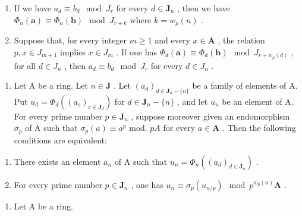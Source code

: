 \begin{enumerate}
\def\labelenumi{\alph{enumi})}
\item
  If we have \(a_d \equiv b_d \mod J_r\) for every \(d \in \mathbf{J}_n\) , then we have \(\Phi_n(\boldsymbol{a}) \equiv \Phi_n(\boldsymbol{b}) \mod J_{r+k}\) where \(k = w_p(n)\) .
\item
  Suppose that, for every integer \(m \geqslant 1\) and every \(x \in \mathbf{A}\) , the relation \(p, x \in J_{m+1}\) implies \(x \in J_m\) . If one has \(\Phi_d(\boldsymbol{a}) \equiv \Phi_d(\boldsymbol{b}) \mod J_{r+w_p(d)}\) , for all \(d \in J_n\) , then \(a_d \equiv b_d \mod J_r\) for every \(d \in J_n\) .
\end{enumerate}

\begin{enumerate}
\def\labelenumi{\arabic{enumi})}
\setcounter{enumi}{30}
\tightlist
\item
  Let A be a ring. Let \(n\in\mathbf{J}\) . Let \((a_{d})_{d\in\mathbf{J}_{n}-\{n\}}\) be a family of elements of A. Put \(u_{d}=\Phi_{d}((a_{e})_{e\in\mathbf{J}_{d}})\) for \(d\in\mathbf{J}_{n}-\{n\}\) , and let \(u_{n}\) be an element of A. For every prime number \(p\in\mathbf{J}_{n}\) , suppose moreover given an endomorphism \(\sigma_{p}\) of A such that \(\sigma_{p}(a)\equiv a^{p}\text{ mod. } pA\) for every \(a\in\mathbf{A}\) . Then the following conditions are equivalent:
\end{enumerate}

\begin{enumerate}
\def\labelenumi{\alph{enumi})}
\item
  There exists an element \(a_n\) of A such that \(u_n = \Phi_n((a_d)_{d \in \mathbf{J}_n})\) .
\item
  For every prime number \(p \in \mathbf{J}_n\) , one has \(u_n \equiv \sigma_p(u_{n/p}) \mod p^{w_p(n)}\mathbf{A}\) .
\end{enumerate}

\begin{enumerate}
\def\labelenumi{\arabic{enumi})}
\setcounter{enumi}{31}
\tightlist
\item
  Let A be a ring.
\end{enumerate}

